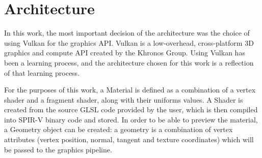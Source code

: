 \section{Architecture}
In this work, the most important decision of the architecture was the choice of using Vulkan for the graphics API. Vulkan is a low-overhead, cross-platform 3D graphics and compute API created by the Khronos Group. Using Vulkan has been a learning process, and the architecture chosen for this work is a reflection of that learning process.

For the purposes of this work, a Material is defined as a combination of a vertex shader and a fragment shader, along with their uniforms values. A Shader is created from the source GLSL code provided by the user, which is then compiled into SPIR-V binary code and stored. In order to be able to preview the material, a Geometry object can be created: a geometry is a combination of vertex attributes (vertex position, normal, tangent and texture coordinates) which will be passed to the graphics pipeline.















